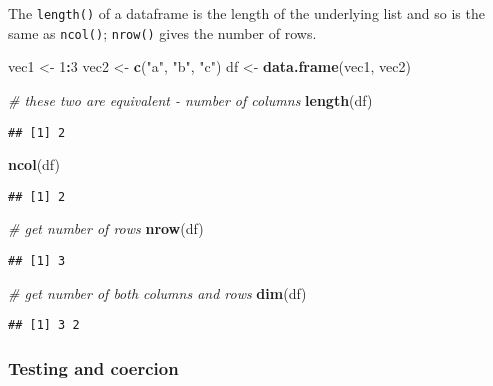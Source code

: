 \documentclass[
]{book}
\newenvironment{Shaded}{\begin{snugshade}}{\end{snugshade}}
\newcommand{\CommentTok}[1]{\textcolor[rgb]{0.56,0.35,0.01}{\textit{#1}}}
\newcommand{\DecValTok}[1]{\textcolor[rgb]{0.00,0.00,0.81}{#1}}
\newcommand{\KeywordTok}[1]{\textcolor[rgb]{0.13,0.29,0.53}{\textbf{#1}}}
\newcommand{\NormalTok}[1]{#1}
\newcommand{\OperatorTok}[1]{\textcolor[rgb]{0.81,0.36,0.00}{\textbf{#1}}}
\newcommand{\StringTok}[1]{\textcolor[rgb]{0.31,0.60,0.02}{#1}}
\begin{document}
The \texttt{length()} of a dataframe is the length of the underlying list and so is the same as \texttt{ncol()}; \texttt{nrow()} gives the number of rows.

\begin{Shaded}
\begin{Highlighting}[]
\NormalTok{vec1 \textless{}{-}}\StringTok{ }\DecValTok{1}\OperatorTok{:}\DecValTok{3}
\NormalTok{vec2 \textless{}{-}}\StringTok{ }\KeywordTok{c}\NormalTok{(}\StringTok{"a"}\NormalTok{, }\StringTok{"b"}\NormalTok{, }\StringTok{"c"}\NormalTok{)}
\NormalTok{df \textless{}{-}}\StringTok{ }\KeywordTok{data.frame}\NormalTok{(vec1, vec2)}

\CommentTok{\# these two are equivalent {-} number of columns}
\KeywordTok{length}\NormalTok{(df)}
\end{Highlighting}
\end{Shaded}

\begin{verbatim}
## [1] 2
\end{verbatim}

\begin{Shaded}
\begin{Highlighting}[]
\KeywordTok{ncol}\NormalTok{(df)}
\end{Highlighting}
\end{Shaded}

\begin{verbatim}
## [1] 2
\end{verbatim}

\begin{Shaded}
\begin{Highlighting}[]
\CommentTok{\# get number of rows}
\KeywordTok{nrow}\NormalTok{(df)}
\end{Highlighting}
\end{Shaded}

\begin{verbatim}
## [1] 3
\end{verbatim}

\begin{Shaded}
\begin{Highlighting}[]
\CommentTok{\# get number of both columns and rows}
\KeywordTok{dim}\NormalTok{(df)}
\end{Highlighting}
\end{Shaded}

\begin{verbatim}
## [1] 3 2
\end{verbatim}

\hypertarget{testing-and-coercion}{%
\subsubsection{Testing and coercion}\label{testing-and-coercion}}
\end{document}
